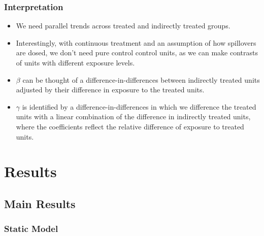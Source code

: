 \documentclass[aspectratio=169, t]{beamer}
\begin{document}
\begin{frame}
\frametitle{Interpretation}

	\vspace{2mm}

	\begin{itemize}
		\vspace{2mm}\item We need parallel trends across treated and indirectly treated groups. 
		\vspace{2mm}\item Interestingly, with continuous treatment and an assumption of how spillovers are dosed, 
		we don't need pure control control units, as we can make contrasts of units with different exposure levels. 
		\vspace{2mm}\item $\beta$ can be thought of a difference-in-differences between indirectly treated units
		adjusted by their difference in exposure to the treated units. 
		\vspace{2mm}\item $\gamma$ is identified by a difference-in-differences in which we difference the treated units with a linear combination 
		of the difference in indirectly treated units, where the coefficients reflect the relative difference of exposure to treated units.
	\end{itemize}
\end{frame}

\section{Results}

\subsection{Main Results}

\begin{frame}[label = static_tab]
    \frametitle{Static Model}

    
    \hyperlink{example_pred_chi_07_2019}{}
\end{frame}
\end{document}
